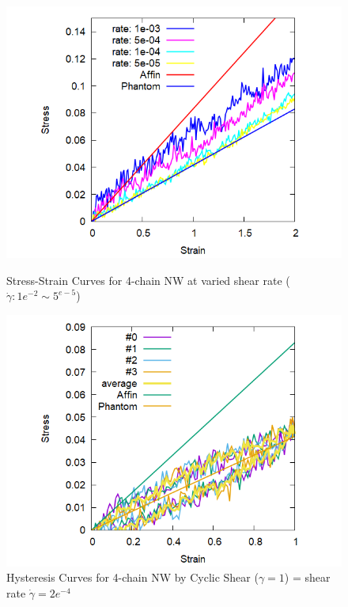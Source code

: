 \documentclass[uplatex,dvipdfmx,a4paper,11pt]{jsarticle}
\begin{document}
\begin{figure}[hb]
\begin{minipage}{0.34\hsize}
    \begin{center}
        \includegraphics[width=\textwidth]{Shear_Random_4chain_N20.png}
        \caption{Stress-Strain Curves for 4-chain NW at varied shear rate ($\dot{\gamma}: 1e^{-2} \sim 5^{e-5}$)}
        \label{fig:deform}
	\end{center}
\end{minipage}
\begin{minipage}{0.34\hsize}
	\begin{center}
        \includegraphics[width=\textwidth]{CyclicDeform_4chain_rate_2e-4.png}
        \caption{Hysteresis Curves for 4-chain NW by Cyclic Shear ($\gamma = 1$) = shear rate $\dot{\gamma} = 2e^{-4}$}

\end{center}
\end{minipage}
\end{figure}
\end{document}
